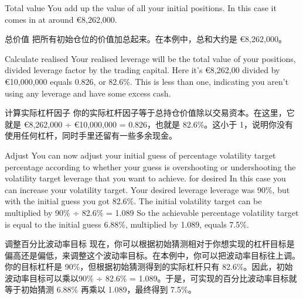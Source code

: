 \bipairgap

\begin{englishblock} Total value You add up the value of all your initial positions. In this case it comes in at around €8,262,000. \end{englishblock}

\begin{chineseblock}总价值 把所有初始仓位的价值加总起来。在本例中，总和大约是 €8,262,000。 \end{chineseblock}

\bipairgap

\begin{englishblock} Calculate realised Your realised leverage will be the total value of your positions, divided leverage factor by the trading capital. Here it's €8,262,00 divided by €10,000,000 equals 0.826, or 82.6\%. This is less than one, indicating you aren't using any leverage and have some excess cash. \end{englishblock}

\begin{chineseblock}计算实际杠杆因子 你的实际杠杆因子等于总持仓价值除以交易资本。在这里，它就是 €8,262,000 ÷ €10,000,000 = 0.826，也就是 82.6\%。这小于 1，说明你没有使用任何杠杆，同时手里还留有一些多余现金。\end{chineseblock}

\bipairgap

\begin{englishblock} Adjust You can now adjust your initial guess of percentage volatility target percentage according to whether your guess is overshooting or undershooting the volatility target leverage that you want to achieve. for desired In this case you can increase your volatility target. Your desired leverage leverage was 90\%, but with the initial guess you got 82.6\%. The initial volatility target can be multiplied by 90\% ÷ 82.6\% = 1.089 So the achievable percentage volatility target is equal to the initial guess 6.88\%, multiplied by 1.089, equals 7.5\%. \end{englishblock}

\begin{chineseblock}调整百分比波动率目标 现在，你可以根据初始猜测相对于你想实现的杠杆目标是偏高还是偏低，来调整这个波动率目标。在本例中，你可以把波动率目标往上调。你的目标杠杆是 90\%，但根据初始猜测得到的实际杠杆只有 82.6\%。因此，初始波动率目标可以乘以90\% ÷ 82.6\% = 1.089。于是，可实现的百分比波动率目标就等于初始猜测 6.88\% 再乘以 1.089，最终得到 7.5\%。 \end{chineseblock}

